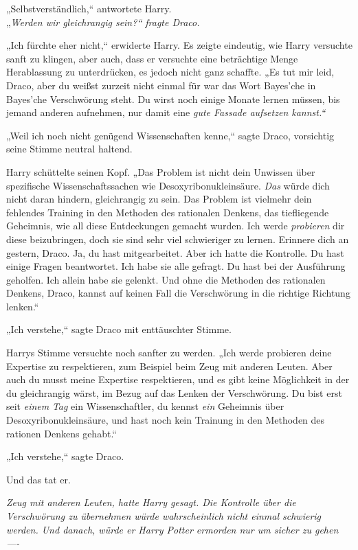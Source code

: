 {„Selbstverständlich,“ antwortete Harry.\\ „\emph{Werden wir gleichrangig sein?“ fragte Draco.}

„Ich fürchte eher nicht,“ erwiderte Harry. Es zeigte eindeutig, wie Harry versuchte sanft zu klingen, aber auch, dass er versuchte eine beträchtige Menge Herablassung zu unterdrücken, es jedoch nicht ganz schaffte. „Es tut mir leid, Draco, aber du weißst zurzeit nicht einmal für war das Wort Bayes'che in Bayes'che Verschwörung steht. Du wirst noch einige Monate lernen müssen, bis jemand anderen aufnehmen, nur damit eine \emph{gute Fassade aufsetzen kannst.“}

„Weil ich noch nicht genügend Wissenschaften kenne,“ sagte Draco, vorsichtig seine Stimme neutral haltend.

Harry schüttelte seinen Kopf. „Das Problem ist nicht dein Unwissen über spezifische Wissenschaftssachen wie Desoxyribonukleinsäure. \emph{Das} würde dich nicht daran hindern, gleichrangig zu sein. Das Problem ist vielmehr dein fehlendes Training in den Methoden des rationalen Denkens, das tiefliegende Geheimnis, wie all diese Entdeckungen gemacht wurden. Ich werde \emph{probieren} dir diese beizubringen, doch sie sind sehr viel schwieriger zu lernen. Erinnere dich an gestern, Draco. Ja, du hast mitgearbeitet. Aber ich hatte die Kontrolle. Du hast einige Fragen beantwortet. Ich habe sie alle gefragt. Du hast bei der Ausführung geholfen. Ich allein habe sie gelenkt. Und ohne die Methoden des rationalen Denkens, Draco, kannst auf keinen Fall die Verschwörung in die richtige Richtung lenken.“

„Ich verstehe,“ sagte Draco mit enttäuschter Stimme.

Harrys Stimme versuchte noch sanfter zu werden. „Ich werde probieren deine Expertise zu respektieren, zum Beispiel beim Zeug mit anderen Leuten. Aber auch du musst meine Expertise respektieren, und es gibt keine Möglichkeit in der du gleichrangig wärst, im Bezug auf das Lenken der Verschwörung. Du bist erst seit \emph{einem} \emph{Tag} ein Wissenschaftler, du kennst \emph{ein} Geheimnis über Desoxyribonukleinsäure, und hast noch kein Trainung in den Methoden des rationen Denkens gehabt.“

„Ich verstehe,“ sagte Draco.

Und das tat er.

\emph{Zeug mit anderen Leuten, hatte Harry gesagt. Die Kontrolle über die Verschwörung zu übernehmen würde wahrscheinlich nicht einmal schwierig werden. Und danach, würde er Harry Potter ermorden nur um sicher zu gehen ----}

}
